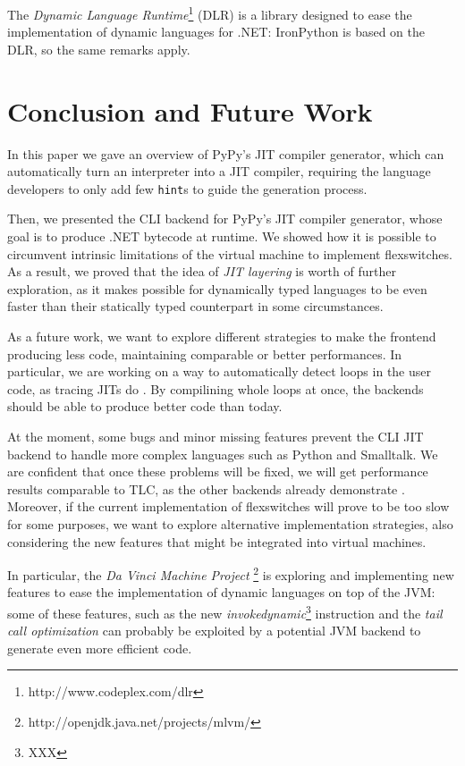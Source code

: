 The \emph{Dynamic Language Runtime}\footnote{http://www.codeplex.com/dlr}
(DLR) is a library designed to ease the implementation of dynamic languages
for .NET: IronPython is based on the DLR, so the same remarks apply.


\section{Conclusion and Future Work}

In this paper we gave an overview of PyPy's JIT compiler generator,
which can automatically turn an interpreter into a JIT
compiler, requiring the language developers to only add few \texttt{hint}s to
guide the generation process.

Then, we presented the CLI backend for PyPy's JIT compiler generator, whose
goal is to produce .NET bytecode at runtime.  We showed how it is possible to
circumvent intrinsic limitations of the virtual machine to implement
flexswitches.  As a result, we proved that the idea of \emph{JIT layering} is
worth of further exploration, as it makes possible for dynamically typed
languages to be even faster than their statically typed counterpart in some
circumstances.

As a future work, we want to explore different strategies to make the frontend
producing less code, maintaining comparable or better performances.  In
particular, we are working on a way to automatically detect loops in the user
code, as tracing JITs do \cite{gal_hotpathvm_2006}.  By compilining whole
loops at once, the backends should be able to produce better code than today.

At the moment, some bugs and minor missing features prevent the CLI JIT
backend to handle more complex languages such as Python and Smalltalk.  We are
confident that once these problems will be fixed, we will get performance
results comparable to TLC, as the other backends already demonstrate
\cite{PyPyJIT}.  Moreover, if the current implementation of flexswitches will
prove to be too slow for some purposes, we want to explore alternative
implementation strategies, also considering the new features that might be
integrated into virtual machines.

In particular, the \emph{Da Vinci Machine
  Project} \footnote{http://openjdk.java.net/projects/mlvm/} is exploring and
implementing new features to ease the implementation of dynamic languages on
top of the JVM: some of these features, such as the new
\emph{invokedynamic}\footnote{XXX} instruction and the \emph{tail call
  optimization} can probably be exploited by a potential JVM backend to
generate even more efficient code.
